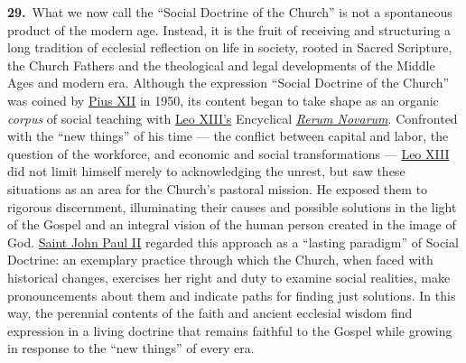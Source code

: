 \documentclass{article}
\begin{document}
\textbf{29.}\ What we now call the ``Social Doctrine of the Church'' is not a spontaneous product of the modern age. Instead, it is the fruit of receiving and structuring a long tradition of ecclesial reflection on life in society, rooted in Sacred Scripture, the Church Fathers and the theological and legal developments of the Middle Ages and modern era. Although the expression ``Social Doctrine of the Church'' was coined by \href{https://www.vatican.va/content/pius-xii/en.html}{Pius XII} in 1950,\cite{n23} its content began to take shape as an organic \emph{corpus} of social teaching with \href{https://www.vatican.va/content/leo-xiii/en.html}{Leo XIII's} Encyclical \href{https://www.vatican.va/content/leo-xiii/en/encyclicals/documents/hf_l-xiii_enc_15051891_rerum-novarum.html}{\emph{Rerum Novarum}}. Confronted with the ``new things'' of his time --- the conflict between capital and labor, the question of the workforce, and economic and social transformations --- \href{https://www.vatican.va/content/leo-xiii/en.html}{Leo XIII} did not limit himself merely to acknowledging the unrest, but saw these situations as an area for the Church's pastoral mission. He exposed them to rigorous discernment, illuminating their causes and possible solutions in the light of the Gospel and an integral vision of the human person created in the image of God. \href{https://www.vatican.va/content/john-paul-ii/en.html}{Saint John Paul II} regarded this approach as a ``lasting paradigm''\cite{n24} of Social Doctrine: an exemplary practice through which the Church, when faced with historical changes, exercises her right and duty to examine social realities, make pronouncements about them and indicate paths for finding just solutions. In this way, the perennial contents of the faith and ancient ecclesial wisdom find expression in a living doctrine that remains faithful to the Gospel while growing in response to the ``new things'' of every era.
\end{document}
